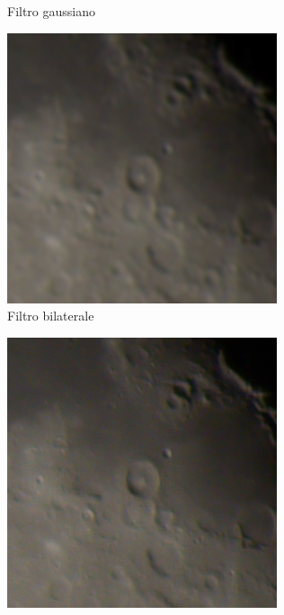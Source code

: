 \begin{figure}[H]
\begin{subfigure}[t]{0.24\textwidth}
        \caption{Filtro gaussiano}
        \label{fig:gaussiano}
    \end{subfigure}
    \hfill
    \begin{subfigure}[t]{0.24\textwidth}
        \centering
        \includegraphics[width=\linewidth]{../assets/den_bilateral_zoom.png}
        \caption{Filtro bilaterale}
        \label{fig:bilaterale}
    \end{subfigure}
    \hfill
    \begin{subfigure}[t]{0.24\textwidth}
        \centering
        \includegraphics[width=\linewidth]{../assets/den_dncnn_zoom.png}

\end{subfigure}
\end{figure}
